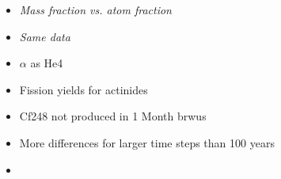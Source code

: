 \begin{itemize}
\item \it{Mass fraction vs. atom fraction}
\item {\it Same data}
\item $\alpha$ as He4
\item Fission yields for actinides
\item Cf248 not produced in 1 Month brwus
\item More differences for larger time steps than 100 years
\item {}
\end{itemize}
